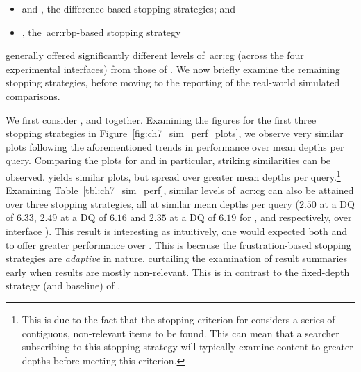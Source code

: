 \vspace*{-2mm}
\begin{itemize}
    \item{ and , the difference-based stopping strategies; and}
    \item{, the~\gls{acr:rbp}-based stopping strategy}
\end{itemize}

\noindent
generally offered significantly different levels of~\gls{acr:cg} (across the four experimental interfaces) from those of . We now briefly examine the remaining stopping strategies, before moving to the reporting of the real-world simulated comparisons.

We first consider ,  and  together. Examining the figures for the first three stopping strategies in Figure~\ref{fig:ch7_sim_perf_plots}, we observe very similar plots following the aforementioned trends in performance over mean depths per query. Comparing the plots for  and  in particular, striking similarities can be observed.  yields similar plots, but spread over greater mean depths per query.\footnote{This is due to the fact that the stopping criterion for  considers a series of contiguous, non-relevant items to be found. This can mean that a searcher subscribing to this stopping strategy will typically examine content to greater depths before meeting this criterion.} Examining Table~\ref{tbl:ch7_sim_perf}, similar levels of~\gls{acr:cg} can also be attained over three stopping strategies, all at similar mean depths per query ($2.50$ at a DQ of $6.33$, $2.49$ at a DQ of $6.16$ and $2.35$ at a DQ of $6.19$ for ,  and  respectively, over interface ). This result is interesting as intuitively, one would expected both  and  to offer greater performance over . This is because the frustration-based stopping strategies are \emph{adaptive} in nature, curtailing the examination of result summaries early when results are mostly non-relevant. This is in contrast to the fixed-depth strategy (and baseline) of .


